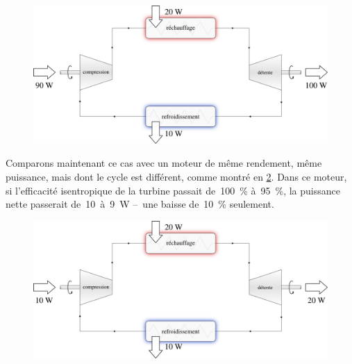 		\begin{figure}
			\begin{center}
				\includegraphics[width=\textwidth]{images/marge_travail_1.png}
			\end{center}
			\label{fig_rapport_puissances_1}
		\end{figure}

		Comparons maintenant ce cas avec un moteur de même rendement, même puissance, mais dont le cycle est différent, comme montré en \cref{fig_rapport_puissances_2}. Dans ce moteur, si l’efficacité isentropique de la turbine passait de~\SI{100}{\percent} à~\SI{95}{\percent}, la puissance nette passerait de~10~à~\SI{9}{\watt} --\ une baisse de~\SI{10}{\percent} seulement.

		\begin{figure}
			\begin{center}
				\includegraphics[width=\textwidth]{images/marge_travail_2.png}
			\end{center}
			\label{fig_rapport_puissances_2}
		\end{figure}

